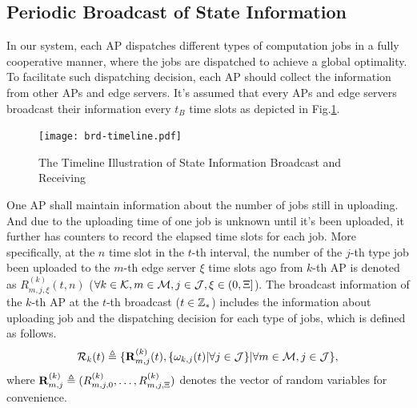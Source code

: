 
\subsection{Periodic Broadcast of State Information}
In our system, each AP dispatches different types of computation jobs in a fully cooperative manner, where the jobs are dispatched to achieve a global optimality.
To facilitate such dispatching decision, each AP should collect the information from other APs and edge servers.
It's assumed that every APs and edge servers broadcast their information every $t_B$ time slots as depicted in Fig.\ref{fig:brd-timeline}.
\begin{figure}[ht]
    \centering
    \texttt{[image: brd-timeline.pdf]}
    \caption{The Timeline Illustration of State Information Broadcast and Receiving}
    \label{fig:brd-timeline}
\end{figure}

One AP shall maintain information about the number of jobs still in uploading. 
And due to the uploading time of one job is unknown until it's been uploaded, it further has counters to record the elapsed time slots for each job.
More specifically, at the $n$ time slot in the $t$-th interval, the number of the $j$-th type job been uploaded to the $m$-th edge server $\xi$ time slots ago from $k$-th AP is denoted as $R^{(k)}_{m,j,\xi}({t,n})$ ($\forall k\in\mathcal{K}, m\in\mathcal{M}, j\in\mathcal{J}, \xi\in(0,\Xi]$).
The broadcast information of the $k$-th AP at the $t$-th broadcast ($t\in\mathbb{Z}_{*}$) includes the information about uploading job and the dispatching decision for each type of jobs, which is defined as follows.
\begin{align}
    \mathcal{R}_{k}({t}) \triangleq \{\mathbf{R}^{(k)}_{m,j}({t}), \{\omega_{k,j}(t)|\forall j\in\mathcal{J}\} | \forall m\in\mathcal{M}, j\in\mathcal{J}\},
\end{align}
where $\mathbf{R}^{(k)}_{m,j} \triangleq ( R^{(k)}_{m,j,0},\dots,R^{(k)}_{m,j,\Xi} )$ denotes the vector of random variables for convenience.

